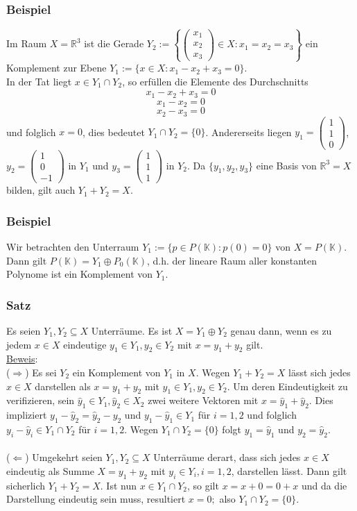 \subsubsection{Beispiel}
\label{2.5.2}
Im Raum $X=\mathbb{R}^3$ ist die Gerade $Y_2:=\left\{\begin{pmatrix}x_1\\x_2\\x_3\end{pmatrix}\in X: x_1=x_2=x_3\right\}$ ein Komplement zur Ebene $Y_1:=\{x\in X: x_1-x_2+x_3=0\}$.\\
In der Tat liegt $x\in Y_1 \cap Y_2$, so erfüllen die Elemente des Durchschnitts\\
\[x_1-x_2+x_3=0\]
\[x_1-x_2=0\]
\[x_2-x_3=0\]
und folglich $x=0$, dies bedeutet $Y_1\cap Y_2=\{0\}$. Andererseits liegen $y_1=\begin{pmatrix}1\\1\\0\end{pmatrix}$, $y_2=\begin{pmatrix}1\\0\\-1\end{pmatrix}$ in $Y_1$ und $y_3=\begin{pmatrix}1\\1\\1\end{pmatrix}$ in $Y_2$. Da $\{y_1,y_2,y_3\}$ eine Basis von $\mathbb{R}^3=X$ bilden, gilt auch $Y_1+Y_2=X$.
\subsubsection{Beispiel}
Wir betrachten den Unterraum $Y_1:=\{p\in P(\mathbb{K}):p(0)=0\}$ von $X=P(\mathbb{K})$.  Dann gilt $P(\mathbb{K})=Y_1 \oplus P_0(\mathbb{K})$, d.h. der lineare Raum aller konstanten Polynome ist ein Komplement von $Y_1$.
\subsubsection{Satz}
Es seien $Y_1,Y_2\subseteq X$ Unterräume.  Es ist $X=Y_1\oplus Y_2$ genau dann, wenn es zu jedem $x\in X$ eindeutige $y_1\in Y_1,y_2\in Y_2$ mit $x=y_1+y_2$ gilt.\\
\underline{Beweis}:\\
($\Rightarrow$) Es sei $Y_2$ ein Komplement von $Y_1$ in $X$.  Wegen $Y_1+Y_2=X$ lässt sich jedes $x\in X$ darstellen als $x=y_1+y_2$ mit $y_1\in Y_1,y_2\in Y_2$.  Um deren Eindeutigkeit zu verifizieren, sein $\hat{y}_1\in Y_1,\hat{y}_2\in X_2$ zwei weitere Vektoren mit $x=\hat{y}_1+\hat{y}_2$.  Dies impliziert $y_1-\hat{y}_2=\hat{y}_2-y_2$ und $y_1-\hat{y}_1\in Y_1$ für $i=1,2$ und folglich $y_i-\hat{y}_i\in Y_1\cap Y_2$ für $i=1,2$.  Wegen $Y_1\cap Y_2 = \{0\}$ folgt $y_1=\hat{y}_1$ und $y_2=\hat{y}_2$.\\
\\
($\Leftarrow$) Umgekehrt seien $Y_1,Y_2\subseteq X$ Unterräume derart, dass sich jedes $x\in X$ eindeutig als Summe $X=y_1+y_2$ mit $y_i\in Y_i,i=1,2$, darstellen lässt.  Dann gilt sicherlich $Y_1+Y_2=X$.  Ist nun $x\in Y_1\cap Y_2$, so gilt $x=x+0=0+x$ und da die Darstellung eindeutig sein muss, resultiert $x=0;$ also $Y_1\cap Y_2=\{0\}$.
